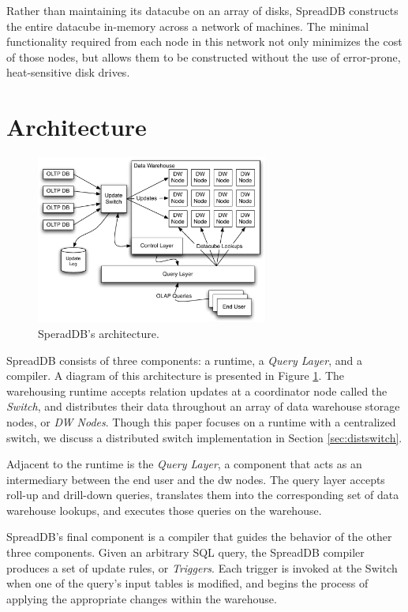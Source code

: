 \documentclass{sig-alternate}
\begin{document}
Rather than maintaining its datacube on an array of disks, SpreadDB constructs the entire datacube in-memory across a network of machines.  The minimal functionality required from each node in this network not only minimizes the cost of those nodes, but allows them to be constructed without the use of error-prone, heat-sensitive disk drives.  

\section{Architecture}
\label{sec:architecture}
\begin{figure}
\begin{center}
\includegraphics[width=3in]{images/Architecture.pdf}
\caption{SperadDB's architecture.}
\label{fig:arch}
\end{center}
\end{figure}
SpreadDB consists of three components: a runtime, a \textit{Query Layer}, and a compiler.  A diagram of this architecture is presented in Figure \ref{fig:arch}.  The warehousing runtime accepts relation updates at a coordinator node called the \textit{Switch}, and distributes their data throughout an array of data warehouse storage nodes, or \textit{DW Nodes}.  Though this paper focuses on a runtime with a centralized switch, we discuss a distributed switch implementation in Section \ref{sec:distswitch}.

Adjacent to the runtime is the \textit{Query Layer}, a component that acts as an intermediary between the end user and the dw nodes.  The query layer accepts roll-up and drill-down queries, translates them into the corresponding set of data warehouse lookups, and executes those queries on the warehouse.

SpreadDB's final component is a compiler that guides the behavior of the other three components.  Given an arbitrary SQL query, the SpreadDB compiler produces a set of update rules, or \textit{Triggers}.  Each trigger is invoked at the Switch when one of the query's input tables is modified, and begins the process of applying the appropriate changes within the warehouse.  
\end{document}
